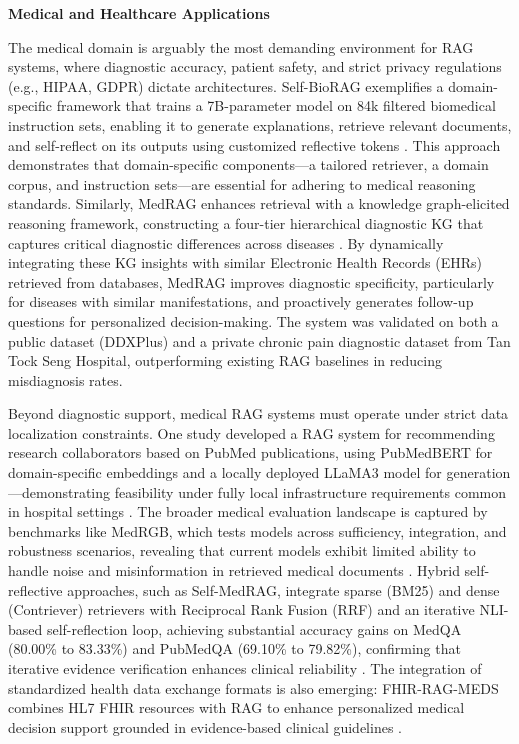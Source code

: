 \documentclass[11pt]{article}
\begin{document}
\textbf{Medical and Healthcare Applications}

The medical domain is arguably the most demanding environment for RAG systems, where diagnostic accuracy, patient safety, and strict privacy regulations (e.g., HIPAA, GDPR) dictate architectures. Self-BioRAG exemplifies a domain-specific framework that trains a 7B-parameter model on 84k filtered biomedical instruction sets, enabling it to generate explanations, retrieve relevant documents, and self-reflect on its outputs using customized reflective tokens \cite{ref555}. This approach demonstrates that domain-specific components---a tailored retriever, a domain corpus, and instruction sets---are essential for adhering to medical reasoning standards. Similarly, MedRAG enhances retrieval with a knowledge graph-elicited reasoning framework, constructing a four-tier hierarchical diagnostic KG that captures critical diagnostic differences across diseases \cite{ref556}. By dynamically integrating these KG insights with similar Electronic Health Records (EHRs) retrieved from databases, MedRAG improves diagnostic specificity, particularly for diseases with similar manifestations, and proactively generates follow-up questions for personalized decision-making. The system was validated on both a public dataset (DDXPlus) and a private chronic pain diagnostic dataset from Tan Tock Seng Hospital, outperforming existing RAG baselines in reducing misdiagnosis rates.

Beyond diagnostic support, medical RAG systems must operate under strict data localization constraints. One study developed a RAG system for recommending research collaborators based on PubMed publications, using PubMedBERT for domain-specific embeddings and a locally deployed LLaMA3 model for generation---demonstrating feasibility under fully local infrastructure requirements common in hospital settings \cite{ref557}. The broader medical evaluation landscape is captured by benchmarks like MedRGB, which tests models across sufficiency, integration, and robustness scenarios, revealing that current models exhibit limited ability to handle noise and misinformation in retrieved medical documents \cite{ref558}. Hybrid self-reflective approaches, such as Self-MedRAG, integrate sparse (BM25) and dense (Contriever) retrievers with Reciprocal Rank Fusion (RRF) and an iterative NLI-based self-reflection loop, achieving substantial accuracy gains on MedQA (80.00\% to 83.33\%) and PubMedQA (69.10\% to 79.82\%), confirming that iterative evidence verification enhances clinical reliability \cite{ref559}. The integration of standardized health data exchange formats is also emerging: FHIR-RAG-MEDS combines HL7 FHIR resources with RAG to enhance personalized medical decision support grounded in evidence-based clinical guidelines \cite{ref560}.
\end{document}
